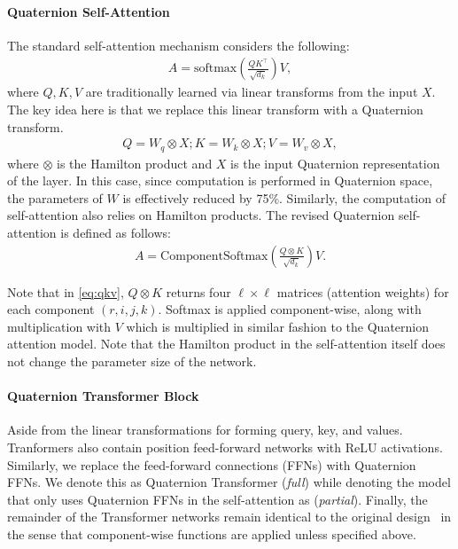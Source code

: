 \documentclass[11pt,a4paper]{article}
\begin{document}
\paragraph{Quaternion Self-Attention}
The standard self-attention mechanism considers the following:
\begin{align*}
A = \text{softmax}(\frac{QK^\top}{\sqrt{d_k}})V,
\end{align*}
where $Q,K,V$ are traditionally learned via linear transforms from the input $X$. The key idea here is that we replace this linear transform with a Quaternion transform.
\begin{align*}
Q = W_{q} \otimes X ; K = W_{k} \otimes X ; V = W_{v} \otimes X,
\end{align*}
where $\otimes$ is the Hamilton product and $X$ is the input Quaternion representation of the layer. In this case, since computation is performed in Quaternion space, the parameters of $W$ is effectively reduced by 75\%. Similarly, the computation of self-attention also relies on Hamilton products. The revised Quaternion self-attention is defined as follows:
\begin{align}
\label{eq:qkv}
A = \text{ComponentSoftmax}(\frac{Q \otimes K}{\sqrt{d_k}})V.
\end{align}

Note that in \eqref{eq:qkv}, $Q \otimes K$ returns four $\ell \times \ell$ matrices (attention weights) for each component $(r,i,j,k)$. Softmax is applied component-wise, along with multiplication with $V$ which is multiplied in similar fashion to the Quaternion attention model. Note that the Hamilton product in the self-attention itself does not change the parameter size of the network.

\paragraph{Quaternion Transformer Block}
Aside from the linear transformations for forming query, key, and values. Tranformers also contain position feed-forward networks with ReLU activations. Similarly, we replace the feed-forward connections (FFNs) with Quaternion FFNs. We denote this as Quaternion Transformer (\emph{full}) while denoting the model that only uses Quaternion FFNs in the self-attention as (\emph{partial}).
Finally, the remainder of the Transformer networks remain identical to the original design~\cite{vaswani2017attention} in the sense that component-wise functions are applied unless specified above.
\end{document}
